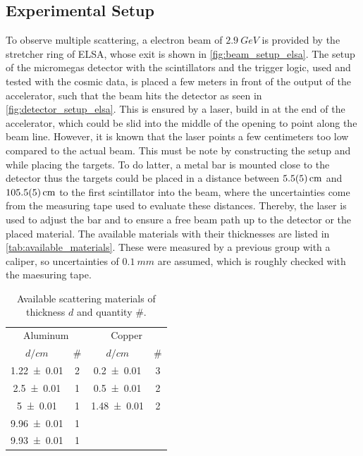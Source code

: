 \documentclass[sn-mathphys-num,iicol]{sn-jnl}
\theoremstyle{thmstyleone}
\theoremstyle{thmstyletwo}
\theoremstyle{thmstylethree}
\begin{document}
\subsection{Experimental Setup}
To observe multiple scattering, a electron beam of $\SI{2.9}{GeV}$ is provided by the stretcher ring of ELSA, whose exit is shown in \autoref{fig:beam_setup_elsa}. The setup of the micromegas detector with the scintillators and the trigger logic, used and tested with the cosmic data, is placed a few meters in front of the output of the accelerator, such that the beam hits the detector as seen in \autoref{fig:detector_setup_elsa}. This is ensured by a laser, build in at the end of the accelerator, which could be slid into the middle of the opening to point along the beam line. However, it is known that the laser points a few centimeters too low compared to the actual beam. This must be note by constructing the setup and while placing the targets.
To do latter, a metal bar is mounted close to the detector thus the targets could be placed in a distance between $\SI{5.5\pm 0.5}{cm}$ and $\SI{105.5\pm 0.5}{cm}$ to the first scintillator into the beam, where the uncertainties come from the measuring tape used to evaluate these distances. Thereby, the laser is used to adjust the bar and to ensure a free beam path up to the detector or the placed material.
The available materials with their thicknesses are listed in \autoref{tab:available_materials}. These were measured by a previous group with a caliper, so uncertainties of $\SI{0.1}{mm}$ are assumed, which is roughly checked with the maesuring tape.


\begin{table}\centering
  \renewcommand*{\arraystretch}{1.1}
  \begin{tabular}{c|c||c|c}
    \multicolumn{2}{c||}{Aluminum} & \multicolumn{2}{c}{Copper} \\
    {\fontsize{8}{3}\selectfont $d/\si{cm}$} & {\fontsize{8}{3}\selectfont \#} & {\fontsize{8}{3}\selectfont $d/\si{cm}$} & {\fontsize{8}{3}\selectfont \# } \\\hline \rule{0pt}{3ex}
    \num{1.22\pm 0.01} & 2 & \num{0.2\pm 0.01} & 3 \\
    \num{2.5\pm 0.01} & 1 & \num{0.5\pm 0.01} & 2 \\
    \num{5\pm 0.01} & 1 & \num{1.48\pm 0.01} & 2 \\
    \num{9.96\pm 0.01} & 1 & & \\
    \num{9.93\pm 0.01} & 1 & & \\
  \end{tabular}\vspace{3mm}
  \caption{Available scattering materials of thickness $d$ and quantity $\#$.}
  \label{tab:available_materials}
\end{table}
\end{document}
